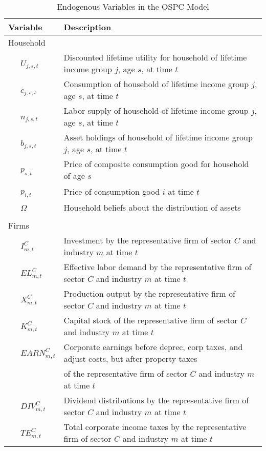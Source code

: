 \documentclass[letterpaper,12pt]{article}
\theoremstyle{definition}
\begin{document}
\begin{table}[h!]
  \centering
  \footnotesize
  \caption{Endogenous Variables in the OSPC Model}
    \begin{tabular}{ll}
    \hline
    \hline
    Variable & Description \\
    \hline
    Household &  \\
    \ \ \ $U_{j,s,t}$ & Discounted lifetime utility for household of lifetime income group $j$, age $s$, at time $t$ \\
    \ \ \ $c_{j,s,t}$ & Consumption of household of lifetime income group $j$, age $s$, at time $t$ \\
    \ \ \ $n_{j,s,t}$ & Labor supply of household of lifetime income group $j$, age $s$, at time $t$ \\
    \ \ \ $b_{j,s,t}$ & Asset holdings of household of lifetime income group $j$, age $s$, at time $t$ \\
    \ \ \ $p_{s,t}$ & Price of composite consumption good for household of age $s$ \\
    \ \ \ $p_{i,t}$ & Price of consumption good $i$ at time $t$ \\
    \ \ \ $\Omega$ & Household beliefs about the distribution of assets \\
          &  \\
    Firms &  \\
    \ \ \ $I^{C}_{m,t}$ & Investment by the representative firm of sector $C$ and industry $m$ at time $t$ \\
    \ \ \ $EL^{C}_{m,t}$ & Effective labor demand by the representative firm of sector $C$ and industry $m$ at time $t$ \\
    \ \ \ $X^{C}_{m,t}$ & Production output by the representative firm of sector $C$ and industry $m$ at time $t$ \\
    \ \ \ $K^{C}_{m,t}$ & Capital stock of the representative firm of sector $C$ and industry $m$ at time $t$ \\
    \ \ \ $EARN^{C}_{m,t}$ & Corporate earnings before deprec, corp taxes, and adjust costs, but after property taxes \\
    				& of the representative firm of sector $C$ and industry $m$ at time $t$ \\
    \ \ \ $DIV^{C}_{m,t}$ & Dividend distributions by the representative firm of sector $C$ and industry $m$ at time $t$ \\
    \ \ \ $TE^{C}_{m,t}$ & Total corporate income taxes by the representative firm of sector $C$ and industry $m$ at time $t$ \\

\end{tabular}
\end{table}
\end{document}
